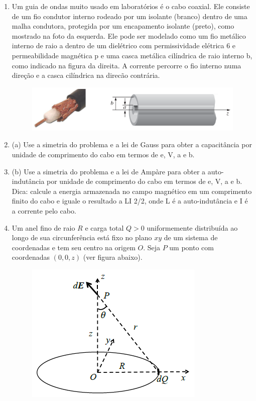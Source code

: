 \begin{enumerate}[start=1,label={\bfseries Q\arabic*.}]
\resposta





\item Um guia de ondas muito usado em laboratórios é o cabo coaxial. Ele consiste de um fio condutor interno rodeado por um isolante (branco) dentro de uma malha condutora, protegida por um encapamento isolante (preto), como mostrado na foto da esquerda. Ele pode ser modelado como um fio metálico interno de raio a dentro de um dielétrico com permissividade elétrica 6 e permeabilidade magnética p e uma casca metálica cilíndrica de raio interno b, como indicado na figura da direita. A corrente percorre o fio interno numa direção e a casca cilíndrica na direcão contrária.

\begin{figure}[H]
\centering
\includegraphics[scale=1]{eletromag-img/coaxial.png}
\end{figure}


\item(a) Use a simetria do problema e a lei de Gauss para obter a capacitância por unidade de comprimento do cabo em termos de e, V, a e b.

\resposta

\item(b) Use a simetria do problema e a lei de Ampàre para obter a auto-indutância por unidade de comprimento do cabo em termos de e, V, a e b. Dica: calcule a energia armazenada no campo magnético em um comprimento finito do cabo e iguale o resultado a LI 2/2, onde L é a auto-indutância e I é a corrente pelo cabo.

\resposta





\item Um anel fino de raio $R$ e carga total $Q > 0$ uniformemente distribuída ao longo de sua circunferência está fixo no plano $xy$ de um sistema de coordenadas e tem seu centro na origem $O$. Seja $P$ um ponto com coordenadas $(0,0,z)$ (ver figura abaixo).
\begin{figure}[H]
\centering
\includegraphics[scale=1]{eletromag-img/anel.png}
\end{figure}


\end{enumerate}
